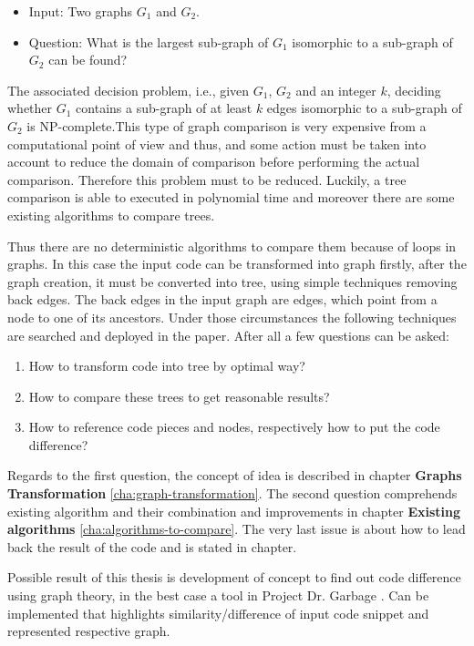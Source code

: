 \documentclass{report}
\begin{document}
\begin{itemize}
	\item     Input: Two graphs $ G_{1}$ and $G_{2}$.
	\item     Question: What is the largest sub-graph of  $ G_{1}$ isomorphic to a sub-graph of  $ G_{2}$ can be found?
\end{itemize}

The associated decision problem, i.e., given $ G_{1}$, $ G_{2}$ and an integer $k$, deciding whether $ G_{1}$ contains a sub-graph of at least $k$ edges isomorphic to a sub-graph of $ G_{2}$ is NP-complete\cite{graph_isomorphism_is}.This type of graph comparison is very expensive from a computational point of view and thus, and some action must be taken into account to reduce the domain of comparison before performing the actual comparison. Therefore this problem must to be reduced. Luckily, a tree comparison is able to executed in polynomial time and moreover there are some existing algorithms to compare trees.

Thus there are no deterministic algorithms to compare them because of loops in graphs. In this case the input code can be transformed into graph firstly, after the graph creation, it must be converted into tree, using simple techniques removing back edges. The back edges in the input graph are edges, which point from a node to one of its ancestors. Under those circumstances the following techniques are searched and deployed in the paper.
After all a few questions can be asked:
\begin{enumerate}
  \item How to transform code into tree by optimal way?
  \item How to compare these trees to get reasonable results?
  \item How to reference code pieces and nodes, respectively how to put the code difference?
\end{enumerate}

Regards to the first question, the concept of idea is described in chapter \textbf{Graphs Transformation} \ref{cha:graph-transformation}. The second question comprehends existing algorithm and their combination and improvements in chapter \textbf{Existing algorithms} \ref{cha:algorithms-to-compare}. The very last issue is about how to lead back the result of the code and is stated in chapter.

Possible result of this thesis is development of concept to find out code difference using graph theory, in the best case a tool in Project Dr. Garbage \cite{drgarbage}. Can be implemented that highlights similarity/difference of input code snippet and represented respective graph.
\end{document}
